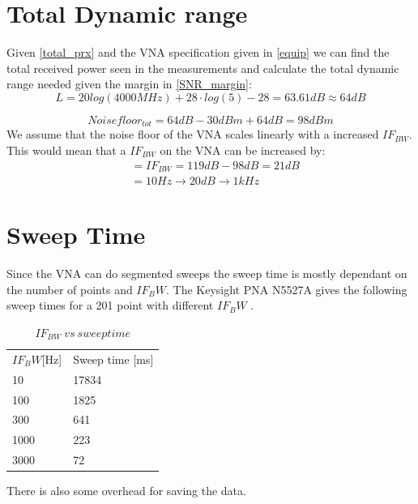 \section{Total Dynamic range}
Given \autoref{total_prx} and the VNA specification given in \autoref{equip} we can find the total received power seen in the measurements and calculate the total dynamic range needed given the margin in \autoref{SNR_margin}:
\begin{equation}
L = 20log (4000MHz) + 28 \cdot log(5)-28 = 63.61dB \approx 64dB
\end{equation}

\begin{equation}
Noisefloor_{tot} = 64dB - 30dBm + 64dB = 98dBm 
\end{equation}
We assume that the noise floor of the \gls{VNA} scales linearly with a increased $IF_{BW}$. This would mean that a $IF_{BW}$ on the \gls{VNA} can be increased by:
\begin{equation}
\begin{split}
&= IF_{BW} = 119dB-98dB = 21dB \\
           &= 10Hz \rightarrow 20dB \rightarrow 1kHz
\end{split}
\end{equation}
\section{Sweep Time}
Since the \gls{VNA} can do segmented sweeps the sweep time is mostly dependant on the number of points and $IF_BW$.
The Keysight PNA N5527A gives the following sweep times for a 201 point with different $IF_BW$ \citep{Key_PNA}.

\begin{table}[H]
\centering
\caption{$IF_{BW} \ vs \ sweep time$}
\label{my-label}
\begin{tabular}{l|l}
\hline
$IF_BW${[}Hz{]} & Sweep time {[}ms{]} \\
10              & 17834               \\
100             & 1825                \\
300             & 641                 \\
1000            & 223                 \\
3000            & 72                 
\end{tabular}
\end{table}


There is also some overhead for saving the data.
